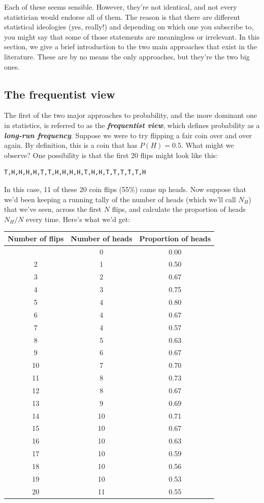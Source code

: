 \documentclass[
  11pt,
  a4paper,
  twoside,symmetric,openright]{book}
\theoremstyle{break}
\theoremstyle{break}
\begin{document}
Each of these seems sensible. However, they're not identical, and not every statistician would endorse all of them. The reason is that there are different statistical ideologies (yes, really!) and depending on which one you subscribe to, you might say that some of those statements are meaningless or irrelevant. In this section, we give a brief introduction to the two main approaches that exist in the literature. These are by no means the only approaches, but they're the two big ones.

\subsection{The frequentist view}\label{the-frequentist-view}

The first of the two major approaches to probability, and the more dominant one in statistics, is referred to as the \textbf{\emph{frequentist view}}, which defines probability as a \textbf{\emph{long-run frequency}}. Suppose we were to try flipping a fair coin over and over again. By definition, this is a coin that has \(P(H) = 0.5\). What might we observe? One possibility is that the first 20 flips might look like this:

\begin{verbatim}
T,H,H,H,H,T,T,H,H,H,H,T,H,H,T,T,T,T,T,H
\end{verbatim}

In this case, 11 of these 20 coin flips (55\%) came up heads. Now suppose that we'd been keeping a running tally of the number of heads (which we'll call \(N_H\)) that we've seen, across the first \(N\) flips, and calculate the proportion of heads \(N_H / N\) every time. Here's what we'd get:

\begin{longtable}[]{@{}ccc@{}}
\toprule\noalign{}
Number of flips & Number of heads & Proportion of heads \\
\midrule\noalign{}
\endhead
\bottomrule\noalign{}
\endlastfoot
1 & 0 & 0.00 \\
2 & 1 & 0.50 \\
3 & 2 & 0.67 \\
4 & 3 & 0.75 \\
5 & 4 & 0.80 \\
6 & 4 & 0.67 \\
7 & 4 & 0.57 \\
8 & 5 & 0.63 \\
9 & 6 & 0.67 \\
10 & 7 & 0.70 \\
11 & 8 & 0.73 \\
12 & 8 & 0.67 \\
13 & 9 & 0.69 \\
14 & 10 & 0.71 \\
15 & 10 & 0.67 \\
16 & 10 & 0.63 \\
17 & 10 & 0.59 \\
18 & 10 & 0.56 \\
19 & 10 & 0.53 \\
20 & 11 & 0.55 \\
\end{longtable}
\end{document}
